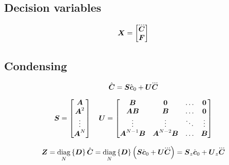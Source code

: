 \documentclass[12pt,a4paper]{article}
\begin{document}

\subsection{Decision variables}
\begin{equation*}
\V{X} = 
\begin{bmatrix} 
    \cJerk \\ 
    \FD
\end{bmatrix}
\end{equation*}


\subsection{Condensing}

\begin{equation*}
\cState = \M{S} \cstate_0     +   \M{U} \cJerk
\end{equation*}

\begin{equation*}
    \mbox{\boldmath $S$} =
        \begin{bmatrix}
        \mbox{\boldmath $A$} \\
        \mbox{\boldmath $A$}^2 \\
        \vdots \\
        \mbox{\boldmath $A$}^{N}\\
        \end{bmatrix}
    \quad
    \mbox{\boldmath $U$} =
        \begin{bmatrix}
        \mbox{\boldmath $B$}               & \mbox{\boldmath $0$}             & \dots & \mbox{\boldmath $0$} \\
        \mbox{\boldmath $A$}\mbox{\boldmath $B$}          & \mbox{\boldmath $B$}             & \dots & \mbox{\boldmath $0$} \\
        \vdots              & \vdots            & \ddots& \vdots \\
        \mbox{\boldmath $A$}^{N-1}\mbox{\boldmath $B$}    & \mbox{\boldmath $A$}^{N-2}\mbox{\boldmath $B$}  & \dots & \mbox{\boldmath $B$} \\
        \end{bmatrix}
\end{equation*}

\begin{equation*}
    \ZMP = 
        \diag{N}{\M{D}} \cState = 
        \diag{N}{\M{D}} \left(\M{S} \cstate_0  +  \M{U} \cJerk \right) = 
        \M{S}_z \cstate_0 + \M{U}_z \cJerk
\end{equation*}
\end{document}
